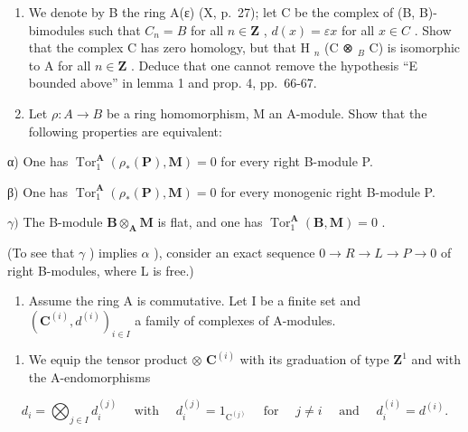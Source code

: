 
\begin{enumerate}
\def\labelenumi{\arabic{enumi})}
\item
  We denote by B the ring A(ε) (X, p.~27); let C be the complex of (B, B)-bimodules such that \(C_{n} = B\) for all \(n \in \mathbf{Z}\) , \(d(x) = \varepsilon x\) for all \(x \in C\) . Show that the complex C has zero homology, but that H \(_{n}\) (C ⊗ \(_{B}\) C) is isomorphic to A for all \(n \in \mathbf{Z}\) . Deduce that one cannot remove the hypothesis “E bounded above” in lemma 1 and prop. 4, pp.~66-67.
\item
  Let \(\rho: A \to B\) be a ring homomorphism, M an A-module. Show that the following properties are equivalent:
\end{enumerate}

α) One has \(\operatorname{Tor}_1^{\mathbf{A}}(\rho_*(\mathbf{P}), \mathbf{M}) = 0\) for every right B-module P.

β) One has \(\operatorname{Tor}_1^{\mathbf{A}}(\rho_{*}(\mathbf{P}),\mathbf{M}) = 0\) for every monogenic right B-module P.

\(\gamma)\) The B-module \(\mathbf{B} \otimes_{\mathbf{A}} \mathbf{M}\) is flat, and one has \(\operatorname{Tor}_{1}^{\mathbf{A}}(\mathbf{B}, \mathbf{M}) = 0\) .

(To see that \(\gamma\) ) implies \(\alpha\) ), consider an exact sequence \(0 \to R \to L \to P \to 0\) of right B-modules, where L is free.)

\begin{enumerate}
\def\labelenumi{\arabic{enumi})}
\setcounter{enumi}{2}
\tightlist
\item
  Assume the ring A is commutative. Let I be a finite set and \((\mathbf{C}^{(i)}, d^{(i)})_{i \in I}\) a family of complexes of A-modules.
\end{enumerate}

\begin{enumerate}
\def\labelenumi{\alph{enumi})}
\tightlist
\item
  We equip the tensor product \(\otimes\) \(\mathbf{C}^{(i)}\) with its graduation of type \(\mathbf{Z}^1\) and with the A-endomorphisms
\end{enumerate}

\[
d _ {i} = \bigotimes_ {j \in I} d _ {i} ^ {(j)} \quad \text { with } \quad d _ {i} ^ {(j)} = 1 _ {\mathrm{C} ^ {(j)}} \quad \text { for } \quad j \neq i \quad \text { and } \quad d _ {i} ^ {(i)} = d ^ {(i)}.
\]

